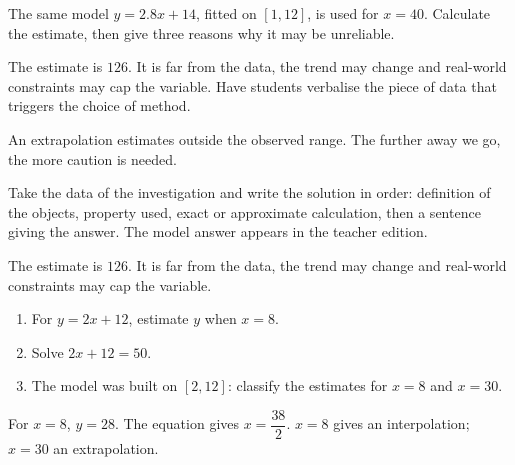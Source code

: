\begin{activity}
The same model $y=\num{2,8}x+14$, fitted on $[1,12]$, is used for $x=40$. Calculate the estimate, then give three reasons why it may be unreliable.
\begin{center}\end{center}
\end{activity}
\begin{solution}The estimate is $126$. It is far from the data, the trend may change and real-world constraints may cap the variable. Have students verbalise the piece of data that triggers the choice of method.\end{solution}

\begin{summary}An extrapolation estimates outside the observed range. The further away we go, the more caution is needed.\end{summary}

\begin{example}
Take the data of the investigation and write the solution in order: definition of the objects, property used, exact or approximate calculation, then a sentence giving the answer. The model answer appears in the teacher edition.
\end{example}
\begin{solution}The estimate is $126$. It is far from the data, the trend may change and real-world constraints may cap the variable.\end{solution}

\begin{exercise}[essential]
\begin{enumerate}\item For $y=2x+12$, estimate $y$ when $x=8$.\item Solve $2x+12=50$.\item The model was built on $[2,12]$: classify the estimates for $x=8$ and $x=30$.\end{enumerate}
\end{exercise}
\begin{solution}For $x=8$, $y=28$. The equation gives $x=\dfrac{38}{2}$. $x=8$ gives an interpolation; $x=30$ an extrapolation.\end{solution}

